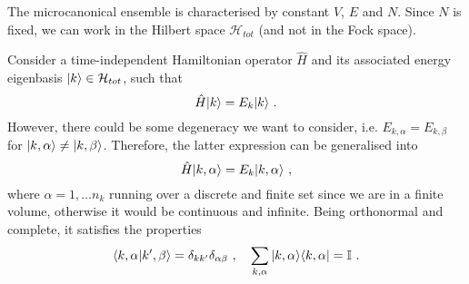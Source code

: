     The microcanonical ensemble is characterised by constant $V$, $E$ and $N$. Since $N$ is fixed, we can work in the Hilbert space $\mathcal H_{tot}$ (and not in the Fock space). 
    
    Consider a time-independent Hamiltonian operator $\hat H$ and its associated energy eigenbasis $\vert k\rangle \in \mathcal H_{tot}$, such that
    \begin{equation*}
        \hat H \vert k\rangle = E_k \vert k\rangle ~.
    \end{equation*}
    However, there could be some degeneracy we want to consider, i.e. $E_{k,\alpha} = E_{k, \beta}$ for $\vert k, \alpha\rangle \neq \vert k, \beta\rangle$. Therefore, the latter expression can be generalised into
    \begin{equation}\label{eneigen}
        \hat H \vert k,\alpha\rangle = E_k \vert k,\alpha\rangle ~,
    \end{equation}
    where $\alpha = 1, \ldots n_k$ running over a discrete and finite set since we are in a finite volume, otherwise it would be continuous and infinite. Being orthonormal and complete, it satisfies the properties 
    \begin{equation*}
        \langle k, \alpha\vert k', \beta\rangle = \delta_{kk'} \delta_{\alpha\beta} ~, \quad \sum_{k, \alpha} \vert k,\alpha\rangle \langle k,\alpha\vert = \mathbb I ~.
    \end{equation*}

